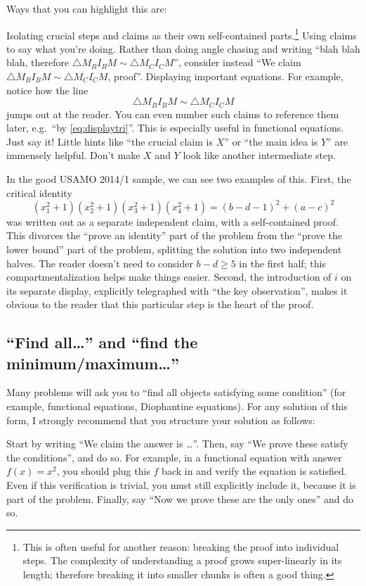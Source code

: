 \documentclass[11pt]{scrartcl}
\begin{document}
Ways that you can highlight this are:
\begin{itemize}
  \ii \alert{Isolating crucial steps and claims}
  as their own self-contained parts.\footnote{This is often useful for another reason:
    breaking the proof into individual steps.
    The complexity of understanding a proof grows super-linearly
    in its length; therefore breaking it into smaller chunks
    is often a good thing.}
  \ii Using \alert{claims} to say what you're doing.
  Rather than doing angle chasing and writing
  ``blah blah blah, therefore $\triangle M_B I_B M \sim \triangle M_C I_C M$'',
  consider instead ``We claim $\triangle M_B I_B M \sim \triangle M_C I_C M$, proof''.
  \ii \alert{Displaying important equations}.
  For example, notice how the line
  \begin{equation}
    \triangle M_B I_B M \sim \triangle M_C I_C M
    \label{eq:displaytri}
  \end{equation}
  jumps out at the reader.
  You can even number such claims to reference them later,
  e.g.\ ``by \eqref{eq:displaytri}''.
  This is especially useful in functional equations.
  \ii \alert{Just say it}!
  Little hints like ``the crucial claim is $X$''
  or ``the main idea is $Y$'' are immensely helpful.
  Don't make $X$ and $Y$ look like another intermediate step.
\end{itemize}

In the good USAMO 2014/1 sample, we can see two examples of this.
First, the critical identity
\[ (x_1^2+1)(x_2^2+1)(x_3^2+1)(x_4^2+1) = (b-d-1)^2 + (a-c)^2 \]
was written out as a separate independent claim, with a self-contained proof.
This divorces the ``prove an identity'' part of the problem from the
``prove the lower bound'' part of the problem,
splitting the solution into two independent halves.
The reader doesn't need to consider $b-d \geq 5$ in the first half;
this compartmentalization helps make things easier.
Second, the introduction of $i$ on its separate display,
explicitly telegraphed with ``the key observation'',
makes it obvious to the reader that this particular step is the heart of the proof.

\subsection{``Find all\dots'' and ``find the minimum/maximum\dots''}
Many problems will ask you to ``find all objects satisfying some condition''
(for example, functional equations, Diophantine equations).
For any solution of this form, I strongly recommend that you
structure your solution as follows:
\begin{itemize}
  \ii Start by writing ``\alert{We claim the answer is \dots}''.
  \ii Then, say ``\alert{We prove these satisfy the conditions}'', and do so.
  For example, in a functional equation with answer $f(x) = x^2$,
  you should plug this $f$ back in and verify the equation is satisfied.
  Even if this verification is trivial, you must still explicitly include it,
  because it is part of the problem.
  \ii Finally, say ``\alert{Now we prove these are the only ones}'' and do so.
\end{itemize}
\end{document}
